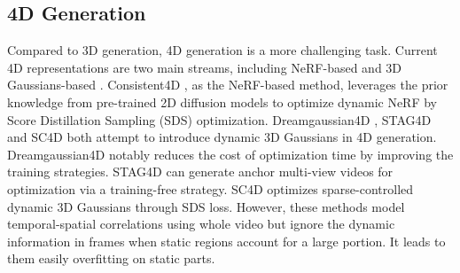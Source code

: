 \subsection{4D Generation}

Compared to 3D generation, 4D generation is a more challenging task. Current 4D representations are two main streams, including NeRF-based \cite{mildenhall2021nerf,park2021nerfies,pumarola2021d,tretschk2021non,wu2022d,fang2022fast} and 3D Gaussians-based \cite{kerbl20233d,li2024spacetime,liang2023gaufre,luiten2024dynamic,li2024dreammesh4d,wu20244d,yang2023real}. Consistent4D \cite{jiang2024consistentd}, as the NeRF-based method, leverages the prior knowledge from pre-trained 2D diffusion models to optimize dynamic NeRF by Score Distillation Sampling (SDS) optimization. Dreamgaussian4D \cite{ren2023dreamgaussian4d}, STAG4D \cite{zeng2024stag4d} and SC4D \cite{wu2024sc4d} both attempt to introduce dynamic 3D Gaussians in 4D generation. Dreamgaussian4D notably reduces the cost of optimization time by improving the training strategies. STAG4D can generate anchor multi-view videos for optimization via a training-free strategy. SC4D optimizes sparse-controlled dynamic 3D Gaussians through SDS loss. However, these methods model temporal-spatial correlations using whole video but ignore the dynamic information in frames when static regions account for a large portion. It leads to them easily overfitting on static parts. 


